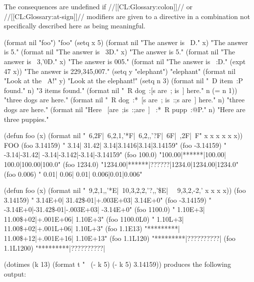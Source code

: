 The consequences are undefined if //[[CL:Glossary:colon]]// or //[[CL:Glossary:at-sign]]// modifiers are given to a directive in a combination not specifically described here as being meaningful.

\endsubsubsection%

\endsubsection%


\code
 (format nil "foo") \EV "foo"
 (setq x 5) 
 (format nil "The answer is ~D." x) \EV "The answer is 5."
 (format nil "The answer is ~3D." x) \EV "The answer is   5."
 (format nil "The answer is ~3,'0D." x) \EV "The answer is 005."
 (format nil "The answer is ~:D." (expt 47 x)) \EV "The answer is 229,345,007."
 (setq y "elephant") \EV "elephant"
 (format nil "Look at the ~A!" y) \EV "Look at the elephant!"
 (setq n 3) 
 (format nil "~D item~:P found." n) \EV "3 items found."
 (format nil "~R dog~:[s are~; is~] here." n (= n 1)) \EV "three dogs are here."
 (format nil "~R dog~:*~[s are~; is~:;s are~] here." n) \EV "three dogs are here."
 (format nil "Here ~[are~;is~:;are~] ~:*~R pupp~:@P." n) \EV "Here are three puppies." \endcode

\code
 (defun foo (x)
   (format nil "~6,2F|~6,2,1,'*F|~6,2,,'?F|~6F|~,2F|~F"
           x x x x x x)) \EV FOO
 (foo 3.14159)  \EV "  3.14| 31.42|  3.14|3.1416|3.14|3.14159"
 (foo -3.14159) \EV " -3.14|-31.42| -3.14|-3.142|-3.14|-3.14159"
 (foo 100.0)    \EV "100.00|******|100.00| 100.0|100.00|100.0"
 (foo 1234.0)   \EV "1234.00|******|??????|1234.0|1234.00|1234.0"
 (foo 0.006)    \EV "  0.01|  0.06|  0.01| 0.006|0.01|0.006" \endcode

\code
 (defun foo (x)  
    (format nil
           "~9,2,1,,'*E|~10,3,2,2,'?,,'\$E|~
            ~9,3,2,-2,'%
           x x x x))
 (foo 3.14159)  \EV "  3.14E+0| 31.42\$-01|+.003E+03|  3.14E+0"
 (foo -3.14159) \EV " -3.14E+0|-31.42\$-01|-.003E+03| -3.14E+0"
 (foo 1100.0)   \EV "  1.10E+3| 11.00\$+02|+.001E+06|  1.10E+3"
 (foo 1100.0L0) \EV "  1.10L+3| 11.00\$+02|+.001L+06|  1.10L+3"
 (foo 1.1E13)   \EV "*********| 11.00\$+12|+.001E+16| 1.10E+13"
 (foo 1.1L120)  \EV "*********|??????????|%
 (foo 1.1L1200) \EV "*********|??????????|%

\code
 (dotimes (k 13)
   (format t "~%
           (- k 5) (- k 5) 3.14159)) \endcode produces the following output:

